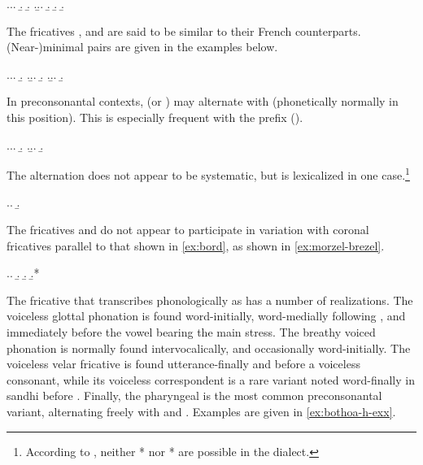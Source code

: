 \ex.\label{ex:bord}\a.\a.
\b.
\b.
\z.\b.\label{ex:rastel-kontel}\a.
\b.
\b.
\b.


The fricatives \ipa{[f~v]}, \ipa{[s~z]} and \ipa{[ʃ~ʒ]} are said to be similar to their French counterparts. \mbox{(Near-)}minimal pairs are given in the examples below.

\ex.\a.\a.
\b.
\z.\b.\a.
\b.
\z.\b.\a.
\b.


In preconsonantal contexts,  (or ) may alternate with \ipa{[h]} (phonetically normally  in this position). This is especially frequent with the prefix  ().

\ex.\label{dislivan-dismantran}\a.\a.
\b.
\z.\b.\a.
\b.

The alternation does not appear to be systematic, but is lexicalized in one case.\footnote{According to \citet[p.~168]{humphreys95:_phonol_bothoa_saint_nicol_pelem}, neither * nor * are possible in the dialect.}

\ex.\a.
\b.


The fricatives \ipa{[ʃ]} and \ipa{[ʒ]} do not appear to participate in variation with coronal fricatives parallel to that shown in \cref{ex:bord}, as shown in \cref{ex:morzel-brezel}.

\ex.\label{ex:morzel-brezel}\a.
\b.
\b.
\b.*

The fricative that \citet{humphreys95:_phonol_bothoa_saint_nicol_pelem} transcribes phonologically as \ipa{[h]} has a number of realizations. The voiceless glottal phonation  is found word-initially, word-medially following \ipa{[l~r]}, and immediately before the vowel bearing the main stress. The breathy voiced phonation  is normally found intervocalically, and occasionally word-initially. The voiceless velar fricative  is found utterance-finally and before a voiceless consonant, while its voiceless correspondent  is a rare variant noted word-finally in sandhi before \ipa{[m~v]}. Finally, the pharyngeal  is the most common preconsonantal variant, alternating freely with  and . Examples are given in \cref{ex:bothoa-h-exx}.


